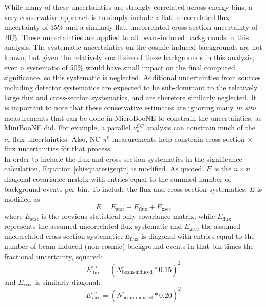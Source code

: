 While many of these uncertainties are strongly correlated across energy bins, a very conservative approach is to simply include a flat, uncorrelated flux uncertainty of 15\% and a similarly flat, uncorrelated cross section uncertainty of 20\%. These uncertainties are applied to all beam-induced backgrounds in this analysis. The systematic uncertainties on the cosmic-induced backgrounds are not known, but given the relatively small size of these backgrounds in this analysis, even a systematic of 50\% would have small impact on the final computed significance, so this systematic is neglected. Additional uncertainties from sources including detector systematics are expected to be sub-dominant to the relatively large flux and cross-section systematics, and are therefore similarly neglected. It is important to note that these conservative estimates are ignoring many \textit{in situ} measurements that can be done in MicroBooNE to constrain the uncertainties, as MiniBooNE did. For example, a parallel $\nu_\mu^{CC}$ analysis can constrain much of the $\nu_e$ flux uncertainties. Also, NC $\pi^0$ measurements help constrain cross section $\times$ flux uncertainties for that process.\\

In order to include the flux and cross-section systematics in the significance calculation, Equation \ref{chisquaresigeqtn} is modified. As quoted, $E$ is the $n\times n$ diagonal covariance matrix with entries equal to the summed number of background events per bin. To include the flux and cross-section systematics, $E$ is modified as
\begin{equation}\label{LEE_emtx_systematics}
E = E_{\text{stat}} + E_{\text{flux}} + E_{\text{xsec}}
\end{equation}
where $E_{\text{stat}}$ is the previous statistical-only covariance matrix, while $E_{\text{flux}}$ represents the assumed uncorrelated flux systematic and $E_{\text{xsec}}$ the assumed uncorrelated cross section systematic. $E_{\text{flux}}$ is diagonal with entries equal to the number of beam-induced (non-cosmic) background events in that bin times the fractional uncertainty, squared:
\begin{equation}\label{LEE_flux_emtx}
E_{\text{flux}}^{i,i} = (N_{\text{beam-induced}}^i*0.15)^2
\end{equation}
and $E_{\text{xsec}}$ is similarly diagonal:
\begin{equation}\label{LEE_xsec_emtx}
E_{\text{xsec}}^{i,i} = (N_{\text{beam-induced}}^i*0.20)^2
\end{equation}

